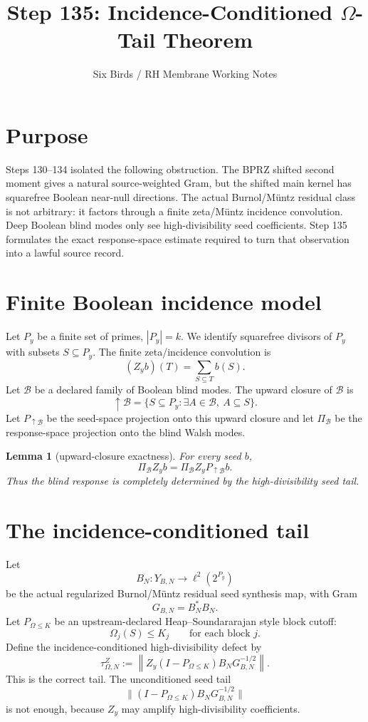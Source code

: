\documentclass[11pt]{article}
\title{Step 135: Incidence-Conditioned $\Omega$-Tail Theorem}
\author{Six Birds / RH Membrane Working Notes}
\date{}
\newtheorem{lemma}{Lemma}
\begin{document}
\maketitle

\section{Purpose}
Steps 130--134 isolated the following obstruction.  The BPRZ shifted second moment gives a natural source-weighted Gram, but the shifted main kernel has squarefree Boolean near-null directions.  The actual Burnol/Müntz residual class is not arbitrary: it factors through a finite zeta/Müntz incidence convolution.  Deep Boolean blind modes only see high-divisibility seed coefficients.  Step 135 formulates the exact response-space estimate required to turn that observation into a lawful source record.

\section{Finite Boolean incidence model}
Let $P_y$ be a finite set of primes, $|P_y|=k$.  We identify squarefree divisors of $P_y$ with subsets $S\subseteq P_y$.  The finite zeta/incidence convolution is
\[
   (Z_y b)(T)=\sum_{S\subseteq T} b(S).
\]
Let $\mathcal B$ be a declared family of Boolean blind modes.  The upward closure of $\mathcal B$ is
\[
   \uparrow\mathcal B=\{S\subseteq P_y:\exists A\in\mathcal B,\ A\subseteq S\}.
\]
Let $P_{\uparrow\mathcal B}$ be the seed-space projection onto this upward closure and let $\Pi_{\mathcal B}$ be the response-space projection onto the blind Walsh modes.

\begin{lemma}[upward-closure exactness]
For every seed $b$,
\[
   \Pi_{\mathcal B}Z_y b=\Pi_{\mathcal B}Z_yP_{\uparrow\mathcal B}b.
\]
Thus the blind response is completely determined by the high-divisibility seed tail.
\end{lemma}

\section{The incidence-conditioned tail}
Let
\[
   B_N:Y_{B,N}\to \ell^2(2^{P_y})
\]
be the actual regularized Burnol/Müntz residual seed synthesis map, with Gram
\[
   G_{B,N}=B_N^*B_N.
\]
Let $P_{\Omega\le K}$ be an upstream-declared Heap--Soundararajan style block cutoff:
\[
   \Omega_j(S)\le K_j\qquad\text{for each block }j.
\]
Define the incidence-conditioned high-divisibility defect by
\[
   \boxed{
   \tau_{\Omega,N}^{Z}
   :=\left\|Z_y(I-P_{\Omega\le K})B_NG_{B,N}^{-1/2}\right\|.
   }
\]
This is the correct tail.  The unconditioned seed tail
\[
   \|(I-P_{\Omega\le K})B_NG_{B,N}^{-1/2}\|
\]
is not enough, because $Z_y$ may amplify high-divisibility coefficients.
\end{document}
